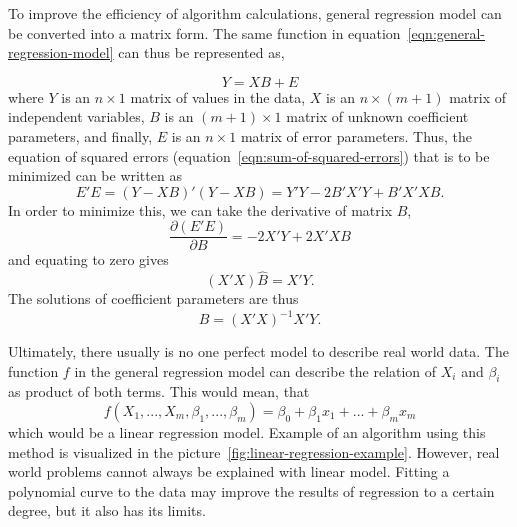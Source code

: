 To improve the efficiency of algorithm calculations,
general regression model can be converted into a matrix form.
The same function in equation~\ref{eqn:general-regression-model}
can thus be represented as,

\begin{equation}
    Y = XB+E
\end{equation}
where $Y$ is an $n\times1$ matrix of values in the data,
$X$ is an $n\times(m+1)$ matrix of independent variables,
$B$ is an $(m+1)\times1$ matrix of unknown coefficient parameters,
and finally, $E$ is an $n\times1$ matrix of error parameters.
Thus, the equation of squared errors (equation~\ref{eqn:sum-of-squared-errors})
that is to be minimized can be written as
\begin{equation}
    E'E = (Y-XB)'(Y-XB) = Y'Y-2B'X'Y+B'X'XB.
\end{equation}
In order to minimize this, we can take the derivative of matrix $B$,
\begin{equation}
    \frac{\partial(E'E)}{\partial B} = -2X'Y + 2X'XB
\end{equation}
and equating to zero gives
\begin{equation}
    (X'X)\hat{B} = X'Y.
\end{equation}
The solutions of coefficient parameters are thus
\begin{equation}
    \hat{B} = (X'X)^{-1}X'Y.
\end{equation}

Ultimately,
there usually is no one perfect model to describe real world data.
The function $f$ in the general regression model
can describe the relation of $X_{i}$ and $\beta_{i}$ as product of both terms.
This would mean, that
\begin{equation}
    f(X_{1},...,X_{m},\beta_{1},...,\beta_{m})=\beta_{0}+\beta_{1}x_{1}+...+\beta_{m}x_{m}
\end{equation}
which would be a linear regression model.
Example of an algorithm using this method
is visualized in the picture~\ref{fig:linear-regression-example}.
However,
real world problems cannot always be explained with linear model.
Fitting a polynomial curve to the data
may improve the results of regression to a certain degree,
but it also has its limits.

